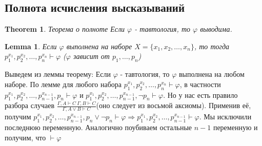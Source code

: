 \documentclass[a4paper]{article}
\theoremstyle{plain}
\newtheorem{theorem}{Theorem}
\newtheorem{lem}{Lemma}
\theoremstyle{remark}
\theoremstyle{definition}
\begin{document}
\subsection{Полнота исчисления высказываний}
\begin{theorem}{Теорема о полноте}
	\newline
	Если $\varphi$ - тавтология, то $\varphi$ выводима.
\end{theorem}

\begin{lem}
	Если $\varphi$ выполнена на наборе $X = \{x_1,x_2, \ldots, x_n\}$, то тогда $p_1^{x_1}, p_2^{x_2}, \ldots, p_n^{x_n} \vdash \varphi$ ($\varphi$ зависит от $p_1, \ldots, p_n$)
\end{lem}

Выведем из леммы теорему: \newline
Если $\varphi$ - тавтология, то $\varphi$ выполнена на любом наборе. По лемме для любого набора $p_1^{x_1}, p_2^{x_2}, \ldots, p_n^{x_n} \vdash \varphi$, в частности $p_1^{x_1}, p_2^{x_2}, \ldots, p_{n-1}^{x_{n-1}}, p_n \vdash \varphi$ и $p_1^{x_1}, p_2^{x_2}, \ldots, p_{n-1}^{x_{n-1}}, \lnot p_n \vdash \varphi$. Но у нас есть правило разбора случаев $\frac{\Gamma,A\vdash C\ \Gamma,B\vdash C}{\Gamma, A\lor B \vdash C}$(оно следует из восьмой аксиомы). Применив её, получим $p_1^{x_1}, p_2^{x_2}, \ldots, p_{n-1}^{x_{n-1}}, p_n \lor \lnot p_n \vdash \varphi \Rightarrow p_1^{x_1}, p_2^{x_2}, \ldots, p_{n-1}^{x_{n-1}} \vdash \varphi$. Мы исключили последнюю переменную. Аналогично поубиваем остальные $n-1$ переменную и получим, что $\vdash \varphi$
\end{document}
